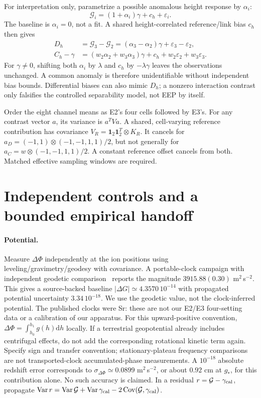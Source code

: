 \documentclass[11pt,a4paper]{article}
\newcommand{\dd}{\mathrm d}
\newcommand{\one}{\mathbf 1}
\begin{document}
For interpretation only, parametrize a possible anomalous height
response by $\alpha_i$:
\begin{equation}
 \mathcal G_i=(1+\alpha_i)\gamma+c_h+\varepsilon_i .
\end{equation}
The baseline is $\alpha_i=0$, not a fit. A shared height-correlated
reference/link bias $c_h$ then gives
\begin{align}
 D_h&=\mathcal G_3-\mathcal G_2
       =(\alpha_3-\alpha_2)\gamma+\varepsilon_3-\varepsilon_2,\\
 C_h-\gamma&=(w_2\alpha_2+w_3\alpha_3)\gamma
              +c_h+w_2\varepsilon_2+w_3\varepsilon_3.
\end{align}
For $\gamma\ne0$, shifting both $\alpha_i$ by $\lambda$ and $c_h$
by $-\lambda\gamma$ leaves the observations unchanged. A common
anomaly is therefore unidentifiable without independent bias bounds.
Differential biases can also mimic $D_h$; a nonzero interaction
contrast only falsifies the controlled separability model, not EEP
by itself.

Order the eight channel means as E2's four cells followed by E3's.
For any contrast vector $a$, its variance is $a^TVa$. A shared,
cell-varying reference contribution has covariance
$V_R=\one_2\one_2^T\otimes K_R$. It cancels for
$a_D=(-1,1)\otimes(-1,-1,1,1)/2$, but not generally for
$a_C=w\otimes(-1,-1,1,1)/2$. A constant reference offset cancels
from both. Matched effective sampling windows are required.

\newpage
\section{Independent controls and a bounded empirical handoff}
\paragraph{Potential.}
Measure $\Delta\Phi$ independently at the ion positions using
leveling/gravimetry/geodesy with covariance. A portable-clock campaign
with independent geodetic comparison~\cite{grotti} reports the magnitude
$3915.88(0.30)$ m$^2$\,s$^{-2}$. This gives a source-backed baseline
$|\Delta G|\simeq4.3570\,10^{-14}$ with propagated potential uncertainty
$3.34\,10^{-18}$. We use the geodetic value, not the clock-inferred
potential. The published clocks were Sr: these are not our E2/E3
four-setting data or a calibration of our apparatus.
For this upward-positive convention,
$\Delta\Phi=\int_{h_0}^{h_1}g(h)\dd h$ locally.
If a terrestrial geopotential already includes centrifugal effects,
do not add the corresponding rotational kinetic term again.
Specify sign and transfer convention; stationary-plateau frequency
comparisons are not transported-clock accumulated-phase measurements.
A $10^{-18}$ absolute redshift error corresponds to
$\sigma_{\Delta\Phi}\simeq0.0899$ m$^2$\,s$^{-2}$, or about
$0.92$ cm at $g_*$, for this contribution alone. No such accuracy
is claimed. In a residual $r=\mathcal G-\gamma_{\rm cal}$, propagate
$\operatorname{Var}r=\operatorname{Var}\mathcal G+
\operatorname{Var}\gamma_{\rm cal}-2\operatorname{Cov}(\mathcal G,\gamma_{\rm cal})$.
\end{document}
